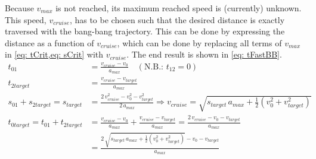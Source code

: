 \noindent Because $v_{max}$ is not reached, its maximum reached speed is (currently) unknown. This speed, $v_{cruise}$, has to be chosen such that the desired distance is exactly traversed with the bang-bang trajectory. This can be done by expressing the distance as a function of $v_{cruise}$, which can be done by replacing all terms of $v_{max}$ in \cref{eq: tCrit,eq: sCrit} with $v_{cruise}$. The end result is shown in \cref{eq: tFastBB}. 
\begin{align}
    t_{01}  &= \frac{v_{cruise} - v_0}{a_{max}} \quad (\text{N.B.: }t_{12} = 0) \nonumber \\
    t_{2target}  &= \frac{v_{cruise} - v_{target}}{a_{max}} \nonumber \\
    s_{01} + s_{2target} = s_{target} &= \frac{2 \, v_{cruise}^2-v_0^2 - v_{target}^2}{2 \, a_{max}} \Rightarrow v_{cruise} = \sqrt{s_{target} \, a_{max} + \frac{1}{2}(v_0^2 + v_{target}^2)} \nonumber \\
t_{0target} = t_{01} + t_{2target} &= \frac{v_{cruise}-v_0}{a_{max}} + \frac{v_{cruise}-v_{target}}{a_{max}} = \frac{2 \, v_{cruise}-v_0 - v_{target}}{a_{max}}\nonumber \\
    &= \frac{2\,\sqrt{s_{target} \, a_{max} + \frac{1}{2}(v_0^2 + v_{target}^2)} -v_0 - v_{target} }{a_{max}} \label{eq: tFastBB}
\end{align}